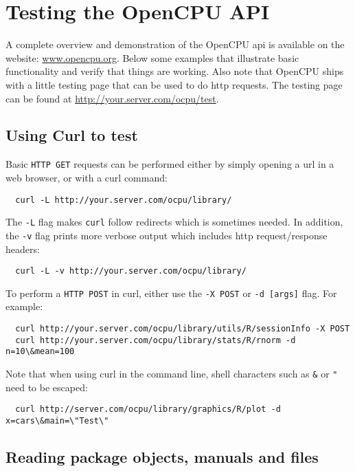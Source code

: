 \documentclass{scrartcl}\usepackage[]{graphicx}\usepackage[]{color}
\begin{document}
\section{Testing the OpenCPU API}

A complete overview and demonstration of the OpenCPU api is available on the website: \href{http://www.opencpu.org}{www.opencpu.org}. Below some examples that illustrate basic functionality and verify that things are working. Also note that OpenCPU ships with a little testing page that can be used to do http requests. The testing page can be found at \url{http://your.server.com/ocpu/test}. 

\subsection{Using Curl to test}


\noindent Basic \texttt{HTTP GET} requests can be performed either by simply opening a url in a web browser, or with a curl command:

\begin{verbatim}
  curl -L http://your.server.com/ocpu/library/
\end{verbatim}
The \texttt{-L} flag makes \texttt{curl} follow redirects which is sometimes needed. In addition, the \texttt{-v} flag prints more verbose output which includes http request/response headers:
\begin{verbatim}
  curl -L -v http://your.server.com/ocpu/library/
\end{verbatim}

\noindent To perform a \texttt{HTTP POST} in curl, either use the \texttt{-X POST} or \texttt{-d [args]} flag. For example:

\begin{verbatim}
  curl http://your.server.com/ocpu/library/utils/R/sessionInfo -X POST
  curl http://your.server.com/ocpu/library/stats/R/rnorm -d n=10\&mean=100
\end{verbatim}

\noindent Note that when using curl in the command line, shell characters such as \texttt{\&} or \texttt{"} need to be escaped:

\begin{verbatim}
  curl http://server.com/ocpu/library/graphics/R/plot -d x=cars\&main=\"Test\"
\end{verbatim}




\subsection{Reading package objects, manuals and files}
\end{document}
